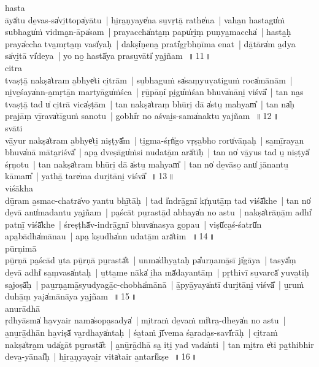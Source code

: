 \documentclass[parskip, DIV=14]{scrartcl}
\begin{document}
{hasta  \\
āyā̍tu de̱vas-sa̍vi̱ttopa̍yātu~|  hi̱ra̱ṇyaye̍na su̱vṛtā̱ rathe̍na~|  vaha̱n hastagu̍ṁ subhagu̍ṁ vidma̱n-āpa̍sam~|  prayaccha̍nta̱ṃ papu̍ri̱ṃ puṇya̱maccha̍~|  hasta̱ḥ praya̍ccha tva̱mṛta̱ṃ vasī̍yaḥ~|  dakṣi̍ṇena̱ prati̍gṛbhṇīma enat~|  dā̱tāra̍m a̱dya sa̍vi̱tā vi̍deya~|  yo no̱ hastā̍ya prasu̱vāti̍ ya̱jñam~\,॥\,11\,॥ \\

citra  \\
tvaṣṭā̱ nakṣa̍tram a̱bhye̍ti ci̱trām~|  su̱bhaguṁ sa̍saṃyuv̱atiguṁ roca̍mānām~|  ni̱ve̱śaya̍nn-a̱mṛtā̱n martyāgu̍ṁśca~|  ṛū̱pāṇi̍ pi̱gu̎ṁśan bhuva̍nāni̱ viśvā̎~|  tan na̱s tvaṣṭā̱ tad u̍ ci̱trā vica̍ṣṭām~|  tan nakṣa̍traṃ bhūri̱ dā a̍stu̱ mahyam̎~|  tan na̍ḥ pra̱jāṃ vī̱rava̍tīguṁ sanotu~|  gobhi̍r no aśvai̱s-sama̍naktu yajñam~\,॥\,12\,॥ \\

svāti  \\
vā̱yur nakṣa̍tram a̱bhye̍ti̱ niṣṭyā̎m~|  ti̱gma-śṛṅ̍go vṛṣa̱bho roru̍vāṇaḥ~|  sa̱mī̱raya̱n bhuva̍nā māta̱riśvā̎~|  apa̱ dveṣāgu̍ṁsi nudatā̱m arā̍tīḥ~|  tan no̍ vā̱yus tad u̱ niṣṭyā̍ śṛṇotu~|  tan nakṣa̍tram bhūri̱ dā a̍stu̱ mahyam̎~|  tan no̍ de̱vāso̱ anu̍ jānantu̱ kāmam̎~|  yathā̱ tare̍ma duri̱tāni̱ viśvā̎~\,॥\,13\,॥ \\

viśākha  \\
dū̱ram a̱smac-chatra̍vo yantu bhī̱tāḥ~|  tad i̍ndrā̱gnī kṛ̍ṇutā̱ṃ tad viśā̍khe~|  tan no̍ de̱vā anu̍madantu ya̱jñam~|  pa̱ścāt pu̱rastā̱d abhaya̍n no astu~|  nakṣa̍trāṇā̱m adhi̍ patnī̱ viśā̍khe~|  śreṣṭhā̍v-indrā̱gnī bhuva̍nasya go̱pau~|  viṣū̍ca̱ś-śatrū̍n apa̱bādha̍mānau~|  apa̱ kṣudha̍nn udatā̱m arā̍tim~\,॥\,14\,॥ \\

pūrṇimā  \\
pū̱rṇā pa̱ścād u̱ta pū̱rṇā pu̱rastā̎t~|  unma̍dhya̱taḥ pa̎urṇamā̱sī ji̍gāya~|  tasyā̎ṃ de̱vā adhi̍ sa̱ṃvasa̍ntaḥ~|  u̱tta̱me nāka̍ i̱ha mā̍dayantāṃ~|  pṛ̱thivī su̱varcā̍ yuva̱tiḥ sa̱joṣā̎ḥ~|  pau̱rṇa̱mā̱syudyagā̱c-chobha̍mānā~|  ā̱pyā̱yaya̍ntī duri̱tāni̱ viśvā̎~|  u̱ruṁ duhā̱ṃ yaja̍mānāya ya̱jñam~\,॥\,15\,॥ \\

anurādhā  \\
ṛdhyāsma̍ ha̱vyair nama̍sopa̱sadya̍~|  mi̱traṁ de̱vaṁ mi̍tra̱-dheya̍n no astu~|  a̱nu̱rā̱dhān ha̱viṣā̍ va̱rdhaya̍ntaḥ~|  śa̱taṁ jī̍vema śa̱rada̱s-savī̍rāḥ~|  ci̱traṁ nakṣa̍tra̱m uda̍gāt pu̱rastā̎t~|  a̱nū̱rā̱dhā sa̱ iti̱ yad vada̍nti~|  tan mi̱tra e̍ti pa̱thibhir deva̱-yānai̎ḥ~|  hi̱ra̱ṇyayai̱r vita̍tair a̱ntari̍kṣe~\,॥\,16\,॥ \\

}
\end{document}
